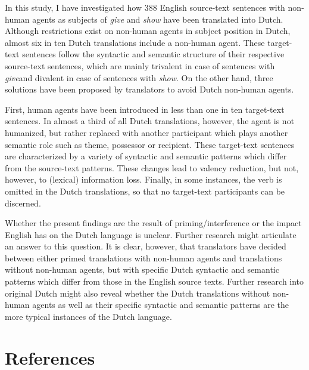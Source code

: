 \documentclass[output=paper]{LSP/langsci}
\begin{document}
In this study, I have investigated how 388 English source-text sentences with non-human agents as subjects of \textit{give} and \textit{show} have been translated into Dutch. Although restrictions exist on non-human agents in subject position in Dutch, almost six in ten Dutch translations include a non-human agent. These target-text sentences follow the syntactic and semantic structure of their respective source-text sentences, which are mainly trivalent in case of sentences with \textit{give}and divalent in case of sentences with \textit{show}. On the other hand, three solutions have been proposed by translators to avoid Dutch non-human agents.

First, human agents have been introduced in less than one in ten target-text sentences. In almost a third of all Dutch translations, however, the agent is not humanized, but rather replaced with another participant which plays another semantic role such as theme, possessor or recipient. These target-text sentences are characterized by a variety of syntactic and semantic patterns which differ from the source-text patterns. These changes lead to valency reduction, but not, however, to (lexical) information loss. Finally, in some instances, the verb is omitted in the Dutch translations, so that no target-text participants can be discerned. 

Whether the present findings are the result of priming/interference or the impact English has on the Dutch language \citep[see e.g.][]{House2008,Delsoir2011} is unclear. Further research might articulate an answer to this question. It is clear, however, that translators have decided between either primed translations with non-human agents and translations without non-human agents, but with specific Dutch syntactic and semantic patterns which differ from those in the English source texts. Further research into original Dutch might also reveal whether the Dutch translations without non-human agents as well as their specific syntactic and semantic patterns are the more typical instances of the Dutch language.            

\section{References}
\printbibliography[heading=subbibliography,notkeyword=this]
\end{document}
